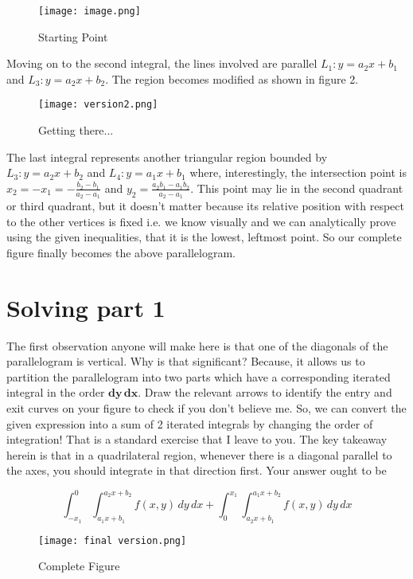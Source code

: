 \documentclass{article}
\begin{document}
\begin{figure}
    \centering
    \texttt{[image: image.png]}
    \caption{Starting Point}
    \label{fig:enter-label}
\end{figure}
Moving on to the second integral, the lines involved are parallel $L_1:y=a_2x+b_1$ and $L_3:y=a_2x+b_2$. The region becomes modified as shown in figure 2.
\begin{figure}
    \centering
    \texttt{[image: version2.png]}
    \caption{Getting there...}
    \label{fig:enter-label}
\end{figure}

The last integral represents another triangular region bounded by $L_3: y=a_2x+b_2$ and $L_4:y=a_1x+b_1$ where, interestingly, the intersection point is $x_2=-x_1=-\displaystyle \frac{b_2-b_1}{a_2-a_1}$ and $y_2=\displaystyle \frac{a_2b_1-a_1b_2}{a_2-a_1}$. This point may lie in the second quadrant or third quadrant, but it doesn't matter because its relative position with respect to the other vertices is fixed i.e. we know visually and we can analytically prove using the given inequalities, that it is the lowest, leftmost point. So our complete figure finally becomes the above parallelogram.

\section{Solving part 1}

The first observation anyone will make here is that one of the diagonals of the parallelogram is vertical. Why is that significant? Because, it allows us to partition the parallelogram into two parts which have a corresponding iterated integral in the order $\mathbf{dy \, dx}$. Draw the relevant arrows to identify the entry and exit curves on your figure to check if you don't believe me. So, we can convert the given expression into a sum of 2 iterated integrals by changing the order of integration! That is a standard exercise that I leave to you. The key takeaway herein is that in a quadrilateral region, whenever there is a diagonal parallel to the axes, you should integrate in that direction first. Your answer ought to be 

$$\int_{-x_1}^{0} \int_{a_1x+b_1}^{a_2x+b_2} f(x,y) \, dy \, dx + \int_{0}^{x_1} \int_{a_2x+b_1}^{a_1x+b_2} f(x,y) \, dy \, dx$$


\begin{figure}
    \centering
    \texttt{[image: final version.png]}
    \caption{Complete Figure}
    \label{fig:enter-label}
\end{figure}
\end{document}
